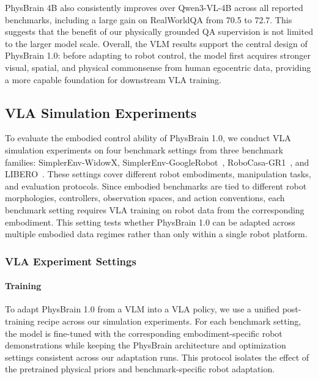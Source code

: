 PhysBrain 4B also consistently improves over Qwen3-VL-4B across all reported benchmarks, including a large gain on RealWorldQA from 70.5 to 72.7. This suggests that the benefit of our physically grounded QA supervision is not limited to the larger model scale. Overall, the VLM results support the central design of PhysBrain 1.0: before adapting to robot control, the model first acquires stronger visual, spatial, and physical commonsense from human egocentric data, providing a more capable foundation for downstream VLA training.

\subsection{VLA Simulation Experiments}
\label{subsec:vla_exp}

To evaluate the embodied control ability of PhysBrain 1.0, we conduct VLA simulation experiments on four benchmark settings from three benchmark families: SimplerEnv-WidowX, SimplerEnv-GoogleRobot~\cite{SimplerEnv_2024_CoRL}, RoboCasa-GR1~\cite{RoboCasa_2024_RSS, GR00T_2025_arXiv}, and LIBERO~\cite{LIBERO_2023_NeurIPS}. These settings cover different robot embodiments, manipulation tasks, and evaluation protocols. Since embodied benchmarks are tied to different robot morphologies, controllers, observation spaces, and action conventions, each benchmark setting requires VLA training on robot data from the corresponding embodiment. This setting tests whether PhysBrain 1.0 can be adapted across multiple embodied data regimes rather than only within a single robot platform.

\subsubsection{VLA Experiment Settings}

\paragraph{Training}
To adapt PhysBrain 1.0 from a VLM into a VLA policy, we use a unified post-training recipe across our simulation experiments. For each benchmark setting, the model is fine-tuned with the corresponding embodiment-specific robot demonstrations while keeping the PhysBrain architecture and optimization settings consistent across our adaptation runs. This protocol isolates the effect of the pretrained physical priors and benchmark-specific robot adaptation.




